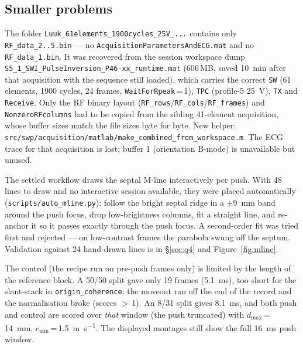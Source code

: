 \documentclass[11pt,a4paper]{article}
\begin{document}
\subsection{Smaller problems}
\begin{description}[leftmargin=1.2em,style=nextline]
  \item[Missing runtime file for the 61-element in-vivo acquisition.] The folder
  \texttt{Luuk\_61elements\_1900cycles\_25V\_...} contains only \texttt{RF\_data\_2..5.bin} --- no
  \texttt{AcquisitionParametersAndECG.mat} and no \texttt{RF\_data\_1.bin}. It was recovered from the
  session workspace dump \texttt{S5\_1\_SWI\_PulseInversion\_P46-xx\_runtime.mat} (606\,MB,
  saved \SI{10}{\minute} after that acquisition with the sequence still loaded), which carries the
  correct \texttt{SW} (61 elements, 1900 cycles, 24 frames, \texttt{WaitForRpeak}\,=\,1),
  \texttt{TPC} (profile-5 \SI{25}{\volt}), \texttt{TX} and \texttt{Receive}. Only the RF binary layout
  (\texttt{RF\_rows}/\texttt{RF\_cols}/\texttt{RF\_frames}) and \texttt{NonzeroRFcolumns} had to be
  copied from the sibling 41-element acquisition, whose buffer sizes match the file sizes byte for
  byte. New helper: \texttt{src/swp/acquisition/matlab/make\_combined\_from\_workspace.m}.
  The ECG trace for that acquisition is lost; buffer 1 (orientation B-mode) is unavailable but unused.

  \item[No hand-drawn M-lines for the new in-vivo data.] The settled workflow draws the septal M-line
  interactively per push. With 48 lines to draw and no interactive session available, they were placed
  automatically (\texttt{scripts/auto\_mline.py}): follow the bright septal ridge in a
  $\pm$\SI{9}{\milli\metre} band around the push focus, drop low-brightness columns, fit a straight
  line, and re-anchor it so it passes exactly through the push focus. A second-order fit was tried
  first and rejected --- on low-contrast frames the parabola swung off the septum. Validation against
  24 hand-drawn lines is in \S\ref{sec:q4} and Figure~\ref{fig:mline}.

  \item[No-push control window.] The control (the recipe run on pre-push frames only) is limited by
  the length of the reference block. A 50/50 split gave only 19 frames (\SI{5.1}{\milli\second}), too
  short for the slant-stack in \texttt{origin\_coherence}: the moveout ran off the end of the record
  and the normalisation broke (scores $>$\,1). An 8/31 split gives \SI{8.1}{\milli\second}, and both
  push and control are scored over \emph{that} window (the push truncated) with
  $d_\mathrm{max}$\,=\,\SI{14}{\milli\metre}, $c_\mathrm{min}$\,=\,\SI{1.5}{\metre\per\second}. The
  displayed montages still show the full \SI{16}{\milli\second} push window.


\end{description}
\end{document}
